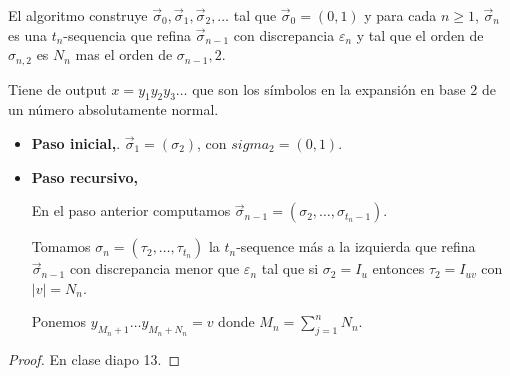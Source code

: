 \documentclass{report}
\theoremstyle{definition} %
\newcommand{\sigmatsequence}{\overset{\rightarrow}{\sigma}}
\begin{document}
El algoritmo construye $\sigmatsequence_0, \sigmatsequence_1, \sigmatsequence_2,
\dots$ tal que $\sigmatsequence_0 = (0, 1)$ y para cada $n \geq 1$,
$\sigmatsequence_n$ es una $t_n$-sequencia que refina $\sigmatsequence_{n-1}$
con discrepancia $\varepsilon_n$ y tal que el orden de $\sigma_{n, 2}$ es $N_n$
mas el orden de $\sigma_{n-1}, 2$.

Tiene de output $x = y_1 y_2 y_3\dots$ que son los símbolos en la expansión en
base 2 de un número absolutamente normal.

\begin{itemize}
    \item[] \textbf{Paso inicial,}. 
        $\sigmatsequence_1 = (\sigma_2)$, con $sigma_2 = (0, 1)$.
    \item[] \textbf{Paso recursivo,} 
    
        En el paso anterior computamos 
        $\sigmatsequence_{n-1} = (\sigma_2, \dots, \sigma_{t_n - 1})$.

        Tomamos $\sigma_n = (\tau_2, \dots, \tau_{t_n})$ la $t_n$-sequence más a
        la izquierda que refina $\sigmatsequence_{n-1}$ con discrepancia menor
        que $\varepsilon_n$ tal que si $\sigma_2 = I_u$ entonces $\tau_2 =
        I_{uv}$ con $|v| = N_n$.

        Ponemos $y_{M_n + 1}\dots y_{M_n + N_n} = v$ donde $M_n = \sum_{j =
        1}^{n} N_n$.
\end{itemize}
\begin{proof}
    En clase diapo 13.
\end{proof}
\end{document}
